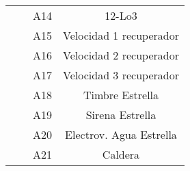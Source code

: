 \begin{longtable}[c]{cccc}
\multicolumn{1}{|c|}{}                                    & \multicolumn{1}{c|}{}                                                                                                                          & \multicolumn{1}{c|}{\cellcolor[HTML]{34CDF9}A14}   & \multicolumn{1}{c|}{12-Lo3}                              \\ \cline{3-4} 
\multicolumn{1}{|c|}{}                                    & \multicolumn{1}{c|}{}                                                                                                                          & \multicolumn{1}{c|}{\cellcolor[HTML]{80EDF3}A15}   & \multicolumn{1}{c|}{Velocidad 1 recuperador}             \\ \cline{3-4} 
\multicolumn{1}{|c|}{}                                    & \multicolumn{1}{c|}{}                                                                                                                          & \multicolumn{1}{c|}{\cellcolor[HTML]{34CDF9}A16}   & \multicolumn{1}{c|}{Velocidad 2 recuperador}             \\ \cline{3-4} 
\multicolumn{1}{|c|}{}                                    & \multicolumn{1}{c|}{}                                                                                                                          & \multicolumn{1}{c|}{\cellcolor[HTML]{80EDF3}A17}   & \multicolumn{1}{c|}{Velocidad 3 recuperador}             \\ \cline{3-4} 
\multicolumn{1}{|c|}{}                                    & \multicolumn{1}{c|}{}                                                                                                                          & \multicolumn{1}{c|}{\cellcolor[HTML]{34CDF9}A18}   & \multicolumn{1}{c|}{Timbre Estrella}                     \\ \cline{3-4} 
\multicolumn{1}{|c|}{}                                    & \multicolumn{1}{c|}{}                                                                                                                          & \multicolumn{1}{c|}{\cellcolor[HTML]{80EDF3}A19}   & \multicolumn{1}{c|}{Sirena Estrella}                     \\ \cline{3-4} 
\multicolumn{1}{|c|}{}                                    & \multicolumn{1}{c|}{}                                                                                                                          & \multicolumn{1}{c|}{\cellcolor[HTML]{34CDF9}A20}   & \multicolumn{1}{c|}{Electrov. Agua Estrella}             \\ \cline{3-4} 
\multicolumn{1}{|c|}{}                                    & \multicolumn{1}{c|}{}                                                                                                                          & \multicolumn{1}{c|}{\cellcolor[HTML]{80EDF3}A21}   & \multicolumn{1}{c|}{Caldera}                             \\ \cline{3-4} 

\end{longtable}

